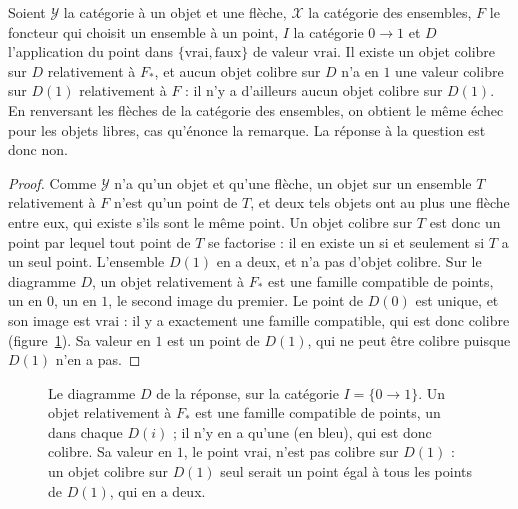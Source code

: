 \begin{encadre}
\begin{contrexemple}
Soient $\mathcal Y$ la catégorie à un objet et une flèche, $\mathcal X$ la catégorie des ensembles, $F$ le foncteur qui choisit un ensemble à un point, $I$ la catégorie $0 \to 1$ et $D$ l'application du point dans $\{\mathrm{vrai}, \mathrm{faux}\}$ de valeur $\mathrm{vrai}$. Il existe un objet colibre sur $D$ relativement à $F_*$, et aucun objet colibre sur $D$ n'a en $1$ une valeur colibre sur $D(1)$ relativement à $F$ : il n'y a d'ailleurs aucun objet colibre sur $D(1)$. En renversant les flèches de la catégorie des ensembles, on obtient le même échec pour les objets libres, cas qu'énonce la remarque. La réponse à la question est donc non.
\end{contrexemple}
\end{encadre}

\begin{proof}
Comme $\mathcal Y$ n'a qu'un objet et qu'une flèche, un objet sur un ensemble $T$ relativement à $F$ n'est qu'un point de $T$, et deux tels objets ont au plus une flèche entre eux, qui existe s'ils sont le même point. Un objet colibre sur $T$ est donc un point par lequel tout point de $T$ se factorise : il en existe un si et seulement si $T$ a un seul point. L'ensemble $D(1)$ en a deux, et n'a pas d'objet colibre. Sur le diagramme $D$, un objet relativement à $F_*$ est une famille compatible de points, un en $0$, un en $1$, le second image du premier. Le point de $D(0)$ est unique, et son image est $\mathrm{vrai}$ : il y a exactement une famille compatible, qui est donc colibre (figure~\ref{fig:bourbaki-448}). Sa valeur en $1$ est un point de $D(1)$, qui ne peut être colibre puisque $D(1)$ n'en a pas.
\end{proof}

\begin{figure}[htbp]
\centering
{}
\caption{Le diagramme $D$ de la réponse, sur la catégorie $I = \{0 \to 1\}$. Un objet relativement à $F_*$ est une famille compatible de points, un dans chaque $D(i)$ ; il n'y en a qu'une (en bleu), qui est donc colibre. Sa valeur en $1$, le point $\mathrm{vrai}$, n'est pas colibre sur $D(1)$ : un objet colibre sur $D(1)$ seul serait un point égal à tous les points de $D(1)$, qui en a deux.}
\label{fig:bourbaki-448}
\end{figure}

